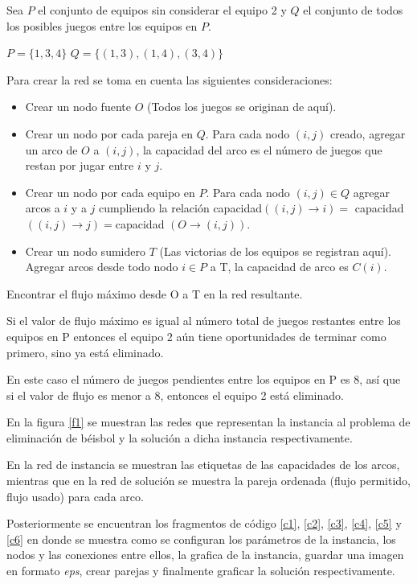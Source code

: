 \documentclass[12pt]{article}
\begin{document}
Sea $P$ el conjunto de equipos sin considerar el equipo 2 y $Q$ el conjunto de todos los posibles juegos entre los equipos en $P$.

$P = \lbrace 1,3,4 \rbrace$ $Q =  \lbrace (1,3),(1,4),(3,4) \rbrace$

Para crear la red se toma en cuenta las siguientes consideraciones:

\begin{itemize}

\item Crear un nodo fuente $O$ (Todos los juegos se originan de aquí).

\item Crear un nodo por cada pareja en $Q$. Para cada nodo $(i,j)$ creado, agregar un arco de $O$ a $(i,j)$, la capacidad del arco es el número de juegos que restan por jugar entre $i$ y $j$. 

\item Crear un nodo por cada equipo en $P$. Para cada nodo $(i,j) \in Q $ agregar arcos a $i$ y a $j$ cumpliendo la relación capacidad$((i,j) \rightarrow i) =  $ capacidad$((i,j) \rightarrow j) = $capacidad $(O \rightarrow (i,j))$.

\item Crear un nodo sumidero $T$ (Las victorias de los equipos se registran aquí). Agregar arcos desde todo nodo $i \in P$ a T, la capacidad de arco es $C(i)$.

\end{itemize}


Encontrar el flujo máximo desde O a T en la red resultante.

Si el valor de flujo máximo es igual al número total de juegos restantes entre los equipos en P entonces el equipo 2 aún tiene oportunidades de terminar como primero, sino ya está eliminado. 

En este caso el número de juegos pendientes entre los equipos en P es 8, así que si el valor de flujo es menor a 8, entonces el equipo 2 está eliminado.

En la figura \ref{f1} se muestran las redes que representan la instancia al problema de eliminación de béisbol y la solución a dicha instancia respectivamente. 

En la red de instancia se muestran las etiquetas de las capacidades de los arcos, mientras que en la red de solución se muestra la pareja ordenada (flujo permitido, flujo usado) para cada arco. 

Posteriormente se encuentran los fragmentos de código \ref{c1}, \ref{c2}, \ref{c3}, \ref{c4}, \ref{c5} y \ref{c6} en donde se muestra como se configuran los parámetros de la instancia, los nodos y las conexiones entre ellos, la grafica de la instancia, guardar una imagen en formato \textit{eps}, crear parejas y finalmente graficar la solución respectivamente.
\end{document}
